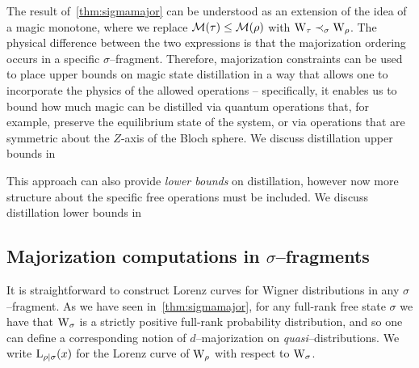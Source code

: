 \documentclass[pra,
aps,
twocolumn,
superscriptaddress,
groupedaddress,
nofootinbib,
reprint
]{revtex4-1}
\begin{document}
The result of~\cref{thm:sigmamajor} can be understood as an extension of the idea of a magic monotone, where we replace $\mathcal{M}(\tau) \leq \mathcal{M}(\rho)$ with $\W{\tau} \prec_\sigma \W{\rho}$. 
The physical difference between the two expressions is that the majorization ordering occurs in a specific $\sigma$--fragment.
Therefore, majorization constraints can be used to place upper bounds on magic state distillation in a way that allows one to incorporate the physics of the allowed operations -- specifically, it enables us to bound how much magic can be distilled via quantum operations that, for example, preserve the equilibrium state of the system, or via operations that are symmetric about the $Z$-axis of the Bloch sphere.
We discuss distillation upper bounds in~

This approach can also provide \emph{lower bounds} on distillation, however now more structure about the specific free operations must be included. 
We discuss distillation lower bounds in~


\subsection{Majorization computations in $\sigma$--fragments}

It is straightforward to construct Lorenz curves for Wigner distributions in any $\sigma$--fragment.
As we have seen in~\cref{thm:sigmamajor}, for any full-rank free state $\sigma$ we have that $\W{\sigma}$ is a strictly positive full-rank probability distribution, and so one can define a corresponding notion of $d$--majorization on \emph{quasi}--distributions.
We write ${{\rm{L}}_{\rho|\sigma}}(x)$ for the Lorenz curve of $\W{\rho}$ with respect to $\W{\sigma}$.
\end{document}
